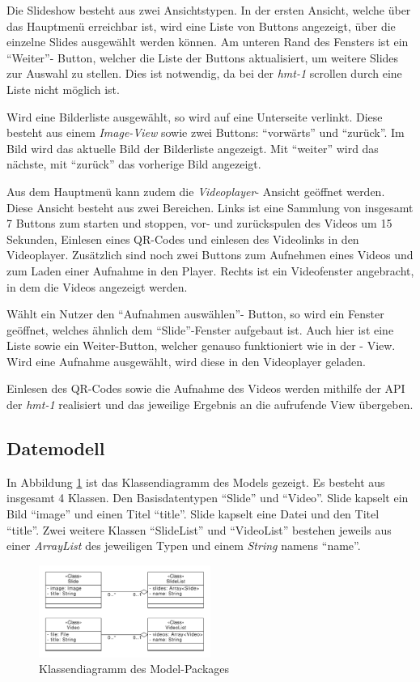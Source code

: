 Die Slideshow besteht aus zwei Ansichtstypen. In der ersten Ansicht, welche über das Hauptmenü erreichbar ist, wird eine Liste von Buttons angezeigt, über die einzelne Slides ausgewählt werden können. Am unteren Rand des Fensters ist ein \enquote{Weiter}- Button, welcher die Liste der Buttons aktualisiert, um weitere Slides zur Auswahl zu stellen. Dies ist notwendig, da bei der \emph{hmt-1} scrollen durch eine Liste nicht möglich ist.

Wird eine Bilderliste ausgewählt, so wird auf eine Unterseite verlinkt. Diese besteht aus einem \emph{Image-View} sowie zwei Buttons: \enquote{vorwärts} und \enquote{zurück}. Im Bild wird das aktuelle Bild der Bilderliste angezeigt. Mit \enquote{weiter} wird das nächste, mit \enquote{zurück} das vorherige Bild angezeigt.

Aus dem Hauptmenü kann zudem die \emph{Videoplayer}- Ansicht geöffnet werden. Diese Ansicht besteht aus zwei Bereichen. Links ist eine Sammlung von insgesamt 7 Buttons zum starten und stoppen, vor- und zurückspulen des Videos um 15 Sekunden, Einlesen eines QR-Codes und einlesen des Videolinks in den Videoplayer. Zusätzlich sind noch zwei Buttons zum Aufnehmen eines Videos und zum Laden einer Aufnahme in den Player. Rechts ist ein Videofenster angebracht, in dem die Videos angezeigt werden.

Wählt ein Nutzer den \enquote{Aufnahmen auswählen}- Button, so wird ein Fenster geöffnet, welches ähnlich dem \enquote{Slide}-Fenster aufgebaut ist. Auch hier ist eine Liste sowie ein Weiter-Button, welcher genauso funktioniert wie in der - View. Wird eine Aufnahme ausgewählt, wird diese in den Videoplayer geladen.

Einlesen des QR-Codes sowie die Aufnahme des Videos werden mithilfe der API der \emph{hmt-1} realisiert und das jeweilige Ergebnis an die aufrufende View übergeben.

\subsection{Datemodell}
In Abbildung \ref{fig:Klassendiagramm_Model} ist das Klassendiagramm des Models gezeigt. Es besteht aus insgesamt 4 Klassen. Den Basisdatentypen \enquote{Slide} und \enquote{Video}. Slide kapselt ein Bild \enquote{image} und einen Titel \enquote{title}. Slide kapselt eine Datei  und den Titel \enquote{title}. Zwei weitere Klassen \enquote{SlideList} und \enquote{VideoList} bestehen jeweils aus einer \emph{ArrayList} des jeweiligen Typen und einem \emph{String} namens \enquote{name}.


\begin{figure}[htbp]
    \centering
    \includegraphics[width=0.5\textwidth]{data/bilder/Klassendiagramm.pdf}
    \caption{Klassendiagramm des Model-Packages}
    \label{fig:Klassendiagramm_Model}
\end{figure}


